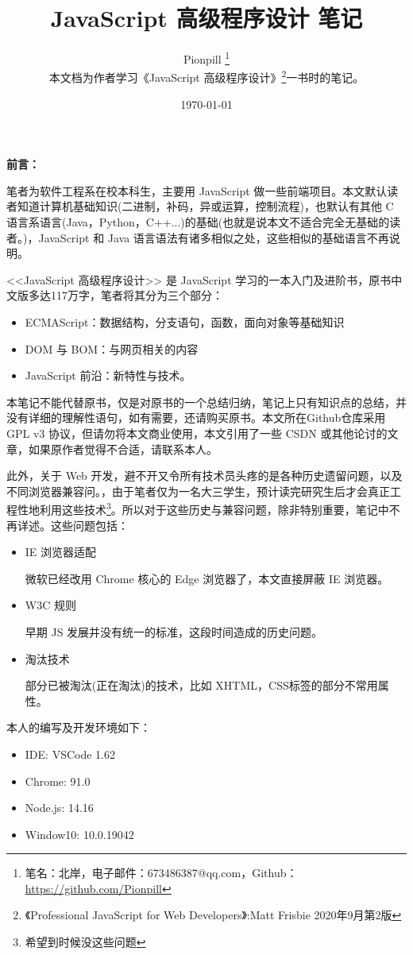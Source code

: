 \documentclass{PionpillNote-book}
\title{JavaScript 高级程序设计 笔记}
\author{
    Pionpill \footnote{笔名：北岸，电子邮件：673486387@qq.com，Github：\url{https://github.com/Pionpill}} \\
    本文档为作者学习《JavaScript 高级程序设计》\footnote{《Professional JavaScript for Web Developers》:Matt Frisbie 2020年9月第2版}一书时的笔记。\\
}
\date{\today}
\begin{document}
\pagestyle{plain}
\maketitle

\noindent\textbf{前言：}

笔者为软件工程系在校本科生，主要用 JavaScript 做一些前端项目。本文默认读者知道计算机基础知识(二进制，补码，异或运算，控制流程)，也默认有其他 C 语言系语言(Java，Python，C++...)的基础(也就是说本文不适合完全无基础的读者。)，JavaScript 和 Java 语言语法有诸多相似之处，这些相似的基础语言不再说明。

<<JavaScript 高级程序设计>> 是 JavaScript 学习的一本入门及进阶书，原书中文版多达117万字，笔者将其分为三个部分：
\begin{itemize}
    \item ECMAScript：数据结构，分支语句，函数，面向对象等基础知识
    \item DOM 与 BOM：与网页相关的内容
    \item JavaScript 前沿：新特性与技术。
\end{itemize}

本笔记不能代替原书，仅是对原书的一个总结归纳，笔记上只有知识点的总结，并没有详细的理解性语句，如有需要，还请购买原书。本文所在Github仓库采用 GPL v3 协议，但请勿将本文商业使用，本文引用了一些 CSDN 或其他论讨的文章，如果原作者觉得不合适，请联系本人。

此外，关于 Web 开发，避不开又令所有技术员头疼的是各种历史遗留问题，以及不同浏览器兼容问。，由于笔者仅为一名大三学生，预计读完研究生后才会真正工程性地利用这些技术\footnote{希望到时候没这些问题}。所以对于这些历史与兼容问题，除非特别重要，笔记中不再详述。这些问题包括：
\begin{itemize}
    \item IE 浏览器适配
    
    微软已经改用 Chrome 核心的 Edge 浏览器了，本文直接屏蔽 IE 浏览器。
    \item W3C 规则
    
    早期 JS 发展并没有统一的标准，这段时间造成的历史问题。
    \item 淘汰技术
    
    部分已被淘汰(正在淘汰)的技术，比如 XHTML，CSS标签的部分不常用属性。
\end{itemize}

本人的编写及开发环境如下：
\begin{itemize}
    \item IDE: VSCode 1.62
    \item Chrome: 91.0
    \item Node.js: 14.16
    \item Window10: 10.0.19042
\end{itemize}
\end{document}
